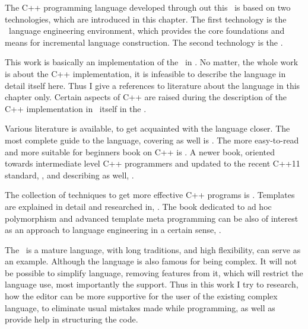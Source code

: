 
The C++ programming language developed through out this \MT\ is based on two technologies, which are 
introduced in this chapter. The first technology is the \jbmps\ language engineering environment, which 
provides the core foundations and means for incremental language construction. The second technology is
the \mbdp. 








This work is basically an implementation of the \cpppl\ in \jbmps. No matter, the whole work 
is about the C++ implementation, it is infeasible to describe the language in detail itself
here. Thus I give a references to literature about the language in this chapter only. Certain 
aspects of C++ are raised during the description of the C++ implementation in \jbmps\ itself in 
the .

Various literature is available, to get acquainted with the language closer. The most complete
guide to the language, covering  as well is \cite{stroustrupcpp2000}. The more 
easy-to-read and more suitable for beginners book on C++ is \cite{schildtcpp}. A newer book,
oriented towards intermediate level C++ programmers and updated to the recent C++11 standard, \cite{cpp11}, and describing 
 as well, \cite{pratacpp}.

The collection of techniques to get more effective C++ programs is \cite{meyerseffcpp}. Templates are explained in 
detail and researched in, \cite{josuttistemplates}. The book dedicated to ad hoc polymorphism and advanced template meta programming can be 
also of interest as an approach to language engineering in a certain sense, \cite{alexandrescumeta}.

The \cpppl\ is a mature language, with long traditions, and high flexibility, \cite{alexandrescu} can serve as an example. 
Although the language is also famous for being complex. It will not be possible to simplify language, removing features from 
it, which will restrict the language use, most importantly the  support. 
Thus in this work I try to research, how the editor can be more supportive for the user of the existing complex language, 
to eliminate usual mistakes made while programming, as well as provide help in structuring the code.